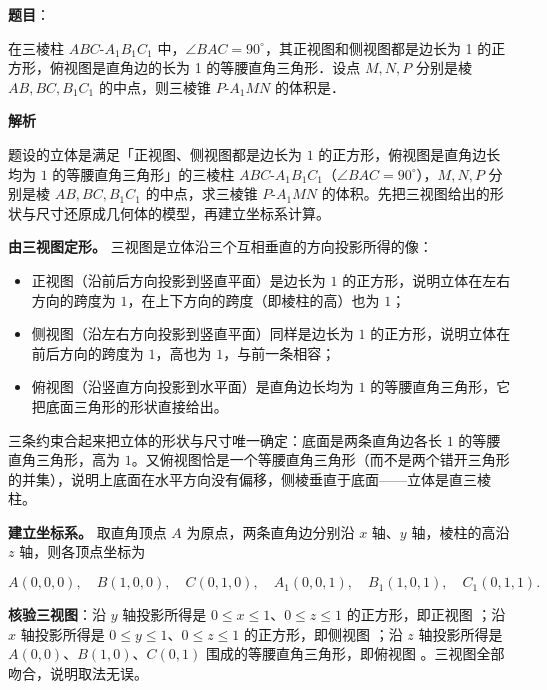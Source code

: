 \begin{answer}

\textbf{题目}：

在三棱柱 \(ABC\text{-}A_1B_1C_1\) 中，\(\angle BAC=90^{\circ}\)，其正视图和侧视图都是边长为 1 的正方形，俯视图是直角边的长为 1 的等腰直角三角形．设点 \(M,N,P\) 分别是棱 \(AB,BC,B_1C_1\) 的中点，则三棱锥 \(P\text{-}A_1MN\) 的体积是\gkblank{}．

\textbf{解析}

题设的立体是满足「正视图、侧视图都是边长为 \(1\) 的正方形，俯视图是直角边长均为 \(1\) 的等腰直角三角形」的三棱柱 \(ABC\text{-}A_1B_1C_1\)（\(\angle BAC=90^{\circ}\)），\(M,N,P\) 分别是棱 \(AB,BC,B_1C_1\) 的中点，求三棱锥 \(P\text{-}A_1MN\) 的体积。先把三视图给出的形状与尺寸还原成几何体的模型，再建立坐标系计算。

\textbf{由三视图定形。} 三视图是立体沿三个互相垂直的方向投影所得的像：

\begin{itemize}
\item 正视图（沿前后方向投影到竖直平面）是边长为 \(1\) 的正方形，说明立体在左右方向的跨度为 \(1\)，在上下方向的跨度（即棱柱的高）也为 \(1\)；
\item 侧视图（沿左右方向投影到竖直平面）同样是边长为 \(1\) 的正方形，说明立体在前后方向的跨度为 \(1\)，高也为 \(1\)，与前一条相容；
\item 俯视图（沿竖直方向投影到水平面）是直角边长均为 \(1\) 的等腰直角三角形，它把底面三角形的形状直接给出。
\end{itemize}

三条约束合起来把立体的形状与尺寸唯一确定：底面是两条直角边各长 \(1\) 的等腰直角三角形，高为 \(1\)。又俯视图恰是一个等腰直角三角形（而不是两个错开三角形的并集），说明上底面在水平方向没有偏移，侧棱垂直于底面——立体是直三棱柱。

\textbf{建立坐标系。} 取直角顶点 \(A\) 为原点，两条直角边分别沿 \(x\) 轴、\(y\) 轴，棱柱的高沿 \(z\) 轴，则各顶点坐标为

\nopagebreak[4]
\[
A(0,0,0),\quad B(1,0,0),\quad C(0,1,0),\quad A_1(0,0,1),\quad B_1(1,0,1),\quad C_1(0,1,1).
\]

\textbf{核验三视图}：沿 \(y\) 轴投影所得是 \(0\leqslant x\leqslant1\)、\(0\leqslant z\leqslant1\) 的正方形，即正视图 ；沿 \(x\) 轴投影所得是 \(0\leqslant y\leqslant1\)、\(0\leqslant z\leqslant1\) 的正方形，即侧视图 ；沿 \(z\) 轴投影所得是 \(A(0,0)\)、\(B(1,0)\)、\(C(0,1)\) 围成的等腰直角三角形，即俯视图 。三视图全部吻合，说明取法无误。


\end{answer}
